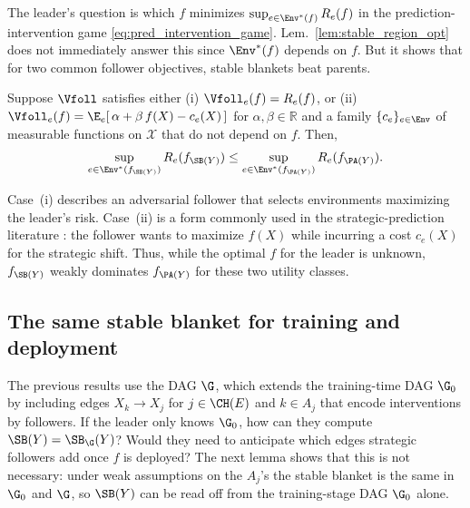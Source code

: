 The leader's question is which $f$ minimizes
$\sup_{e \in \Env^*(f)} R_e(f)$ in the prediction-intervention game \eqref{eq:pred_intervention_game}. Lem.~\ref{lem:stable_region_opt} does not immediately answer this since $\Env^*(f)$ depends on $f$. 
But it shows that for two common follower objectives, stable blankets beat
parents.
\begin{theorem} \label{thm:PA_vs_SB_game}
Suppose $\Vfoll$ satisfies either
(i) $\Vfoll_e(f) = R_e(f)$, or
(ii) $\Vfoll_e(f) = \E_e[\,\alpha + \beta\, f(X) - c_e(X)\,]$ for
$\alpha, \beta \in \mathbb{R}$ and a family $\{c_e\}_{e \in \Env}$ of
measurable functions on $\mathcal{X}$ that do not depend on $f$. Then, 
$$
\sup_{e \in \Env^*(f_{\SB(Y)})} R_e(f_{\SB(Y)})
   \leq \sup_{e \in \Env^*(f_{\PA(Y)})} R_e(f_{\PA(Y)}).
   $$
\end{theorem}

Case~(i) describes an adversarial follower that selects environments maximizing
the leader's risk. Case~(ii) is a form commonly used in the
strategic-prediction literature \citep{hardtStrategicClassification2016}: the
follower wants to maximize $f(X)$ while incurring a cost $c_e(X)$ for the strategic shift. Thus, while the optimal $f$ for the leader is unknown, $f_{\SB(Y)}$ weakly dominates $f_{\PA(Y)}$ for these two utility classes.




\subsection{The same stable blanket for training and deployment} \label{sec:augmentation}

The previous results use the DAG $\G$, which extends the training-time DAG $\G_0$ by including edges $X_k \to X_j$ for $j \in \CH(E)$ and $k \in A_j$ that encode interventions by followers. 
If the leader only knows $\G_0$, how can they compute $\SB(Y) = \SB_{\G}(Y)$?
Would they need to anticipate which edges strategic followers add once $f$ is deployed? 
The next lemma shows that this is not necessary: 
under weak assumptions on the $A_j$'s
the stable blanket is the same in $\G_0$ and $\G$, so $\SB(Y)$ can be read off from the training-stage DAG $\G_0$ alone.


